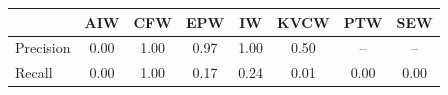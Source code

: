 \begin{tabular}{@{}lccccccc@{}}
\toprule
 & AIW & CFW & EPW & IW & KVCW & PTW & SEW \\
\midrule
Precision & 0.00 & 1.00 & 0.97 & 1.00 & 0.50 & -- & -- \\
Recall & 0.00 & 1.00 & 0.17 & 0.24 & 0.01 & 0.00 & 0.00 \\
\bottomrule
\end{tabular}
